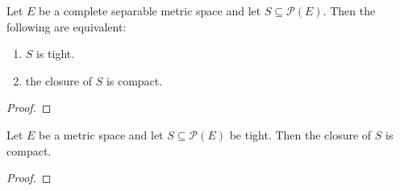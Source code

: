\begin{theorem}\label{thm:prokhorov}
\notready
Let $E$ be a complete separable metric space and let $S \subseteq \mathcal P(E)$. Then the following are equivalent:
\begin{enumerate}
	\item $S$ is tight.
	\item the closure of $S$ is compact.
\end{enumerate}
\end{theorem}

\begin{proof}%

\end{proof}

\begin{lemma}\label{lem:relatively_compact_of_tight}
Let $E$ be a metric space and let $S \subseteq \mathcal P(E)$ be tight. Then the closure of $S$ is compact.
\end{lemma}

\begin{proof}
\end{proof}
